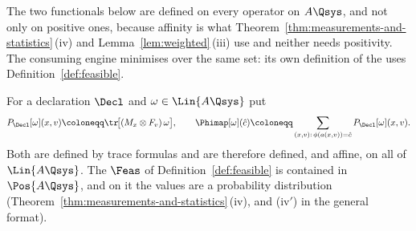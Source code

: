 
The two functionals below are defined on every operator on $A\Qsys$, and not
only on positive ones, because affinity is what
Theorem~\ref{thm:measurements-and-statistics}\,(iv) and Lemma~\ref{lem:weighted}\,(iii) use and
neither needs positivity. The consuming engine minimises over the same set:
its own definition of the  uses
Definition~\ref{def:feasible}.

\begin{definition}\label{def:phi}
For a declaration $\Decl$ and $\omega\in\Lin{A\Qsys}$ put
\begin{equation}\label{eq:jointdist}
  P_{\Decl}[\omega](x,v)\coloneqq\tr\!\big[(M_x\otimes F_v)\,\omega\big],
  \qquad
  \Phimap[\omega](\hat c)\coloneqq
  \sum_{(x,v):\,\phi(a(x,v))=\hat c}P_{\Decl}[\omega](x,v).
\end{equation}
Both are defined by trace formulas and are therefore defined, and affine, on
all of $\Lin{A\Qsys}$. The  $\Feas$ of
Definition~\ref{def:feasible} is contained in $\Pos{A\Qsys}$, and on it the
values are a probability distribution
(Theorem~\ref{thm:measurements-and-statistics}\,(iv), and (iv$'$) in the
general format).
\end{definition}
